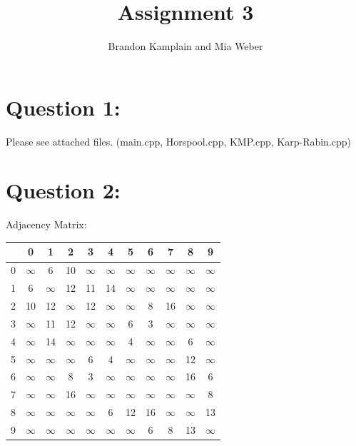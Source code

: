 \documentclass{article}
\begin{document}
\title{Assignment 3}
\author{Brandon Kamplain and Mia Weber}

\maketitle
\newpage

\section{Question 1:}
Please see attached files. (main.cpp, Horspool.cpp, KMP.cpp, Karp-Rabin.cpp)

\section{Question 2:}

\begin{center}
\noindent Adjacency Matrix:

\begin{tabular}{c || c | c | c | c | c | c | c | c | c | c |} 
& 0 & 1 & 2 & 3 & 4 & 5 & 6 & 7 & 8 & 9 \\  [0.5ex] 
\hline\hline
0 & $\infty$ & 6 & 10 & $\infty$ & $\infty$ & $\infty$ & $\infty$ & $\infty$ & $\infty$ & $\infty$ \\ 
\hline
1 & 6 & $\infty$ & 12 & 11 & 14 & $\infty$ & $\infty$ & $\infty$ & $\infty$ & $\infty$ \\
\hline
2 & 10 & 12 & $\infty$ & 12 & $\infty$ & $\infty$ & 8 & 16 & $\infty$ & $\infty$ \\
\hline
3 & $\infty$ & 11 & 12 & $\infty$ & $\infty$ & 6 & 3 & $\infty$ & $\infty$ & $\infty$ \\
\hline
4 & $\infty$ & 14 & $\infty$ & $\infty$ & $\infty$ & 4 & $\infty$ & $\infty$ & 6 & $\infty$ \\ 
\hline
5 & $\infty$ & $\infty$ & $\infty$ & 6 & 4 & $\infty$ & $\infty$ & $\infty$ & 12 & $\infty$ \\ 
\hline
6 & $\infty$ & $\infty$ & 8 & 3 & $\infty$ & $\infty$ & $\infty$ & $\infty$ & 16 & 6 \\
\hline
7 & $\infty$ & $\infty$ & 16 & $\infty$ & $\infty$ & $\infty$ & $\infty$ & $\infty$ & $\infty$ & 8 \\
\hline
8 & $\infty$ & $\infty$ & $\infty$ & $\infty$ & 6 & 12 & 16 & $\infty$ & $\infty$ & 13 \\
\hline
9 & $\infty$ & $\infty$ & $\infty$ & $\infty$ & $\infty$ & $\infty$ & 6 & 8 & 13 & $\infty$ \\  [1ex] 
\hline
\end{tabular}
\end{center}
\end{document}
